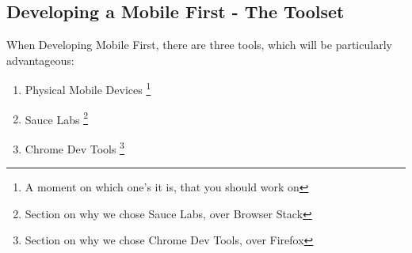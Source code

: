 \subsection{ Developing a Mobile First - The Toolset }
When Developing Mobile First, there are three tools, which will be particularly
advantageous:
\begin{enumerate}
  \item Physical Mobile Devices \footnote{A moment on which one's it is, that
  you should work on}
  \item Sauce Labs \footnote{Section on why we chose Sauce Labs, over Browser
  Stack}
  \item Chrome Dev Tools \footnote{Section on why we chose Chrome Dev Tools,
  over Firefox}
\end{enumerate}
